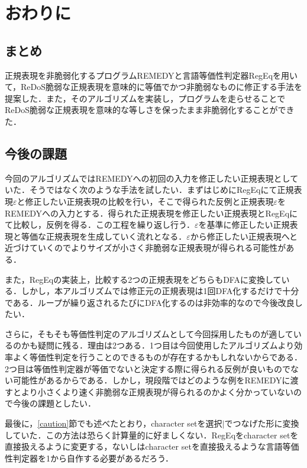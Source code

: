 \documentclass[a4paper, 12pt, dvipdfmx, uplatex]{jsreport}
\begin{document}
\chapter{おわりに}
\section{まとめ}
正規表現を非脆弱化するプログラムREMEDYと言語等価性判定器RegEqを用いて，ReDoS脆弱な正規表現を意味的に等価でかつ非脆弱なものに修正する手法を提案した．また，そのアルゴリズムを実装し，プログラムを走らせることでReDoS脆弱な正規表現を意味的な等しさを保ったまま非脆弱化することができた．

\section{今後の課題}
今回のアルゴリズムではREMEDYへの初回の入力を修正したい正規表現としていた．そうではなく次のような手法を試したい．まずはじめにRegEqにて正規表現$\varepsilon$と修正したい正規表現の比較を行い，そこで得られた反例と正規表現$\varepsilon$をREMEDYへの入力とする．得られた正規表現を修正したい正規表現とRegEqにて比較し，反例を得る．この工程を繰り返し行う．$\varepsilon$を基準に修正したい正規表現と等価な正規表現を生成していく流れとなる．$\varepsilon$から修正したい正規表現へと近づけていくのでよりサイズが小さく非脆弱な正規表現が得られる可能性がある．

また，RegEqの実装上，比較する2つの正規表現をどちらもDFAに変換している．しかし，本アルゴリズムでは修正元の正規表現は1回DFA化するだけで十分である．ループが繰り返されるたびにDFA化するのは非効率的なので今後改良したい．

さらに，そもそも等価性判定のアルゴリズムとして今回採用したものが適しているのかも疑問に残る．理由は2つある．1つ目は今回使用したアルゴリズムより効率よく等価性判定を行うことのできるものが存在するかもしれないからである．2つ目は等価性判定器が等価でないと決定する際に得られる反例が良いものでない可能性があるからである．しかし，現段階ではどのような例をREMEDYに渡すとより小さくより速く非脆弱な正規表現が得られるのかよく分かっていないので今後の課題としたい．

最後に，\ref{caution}節でも述べたとおり，character setを選択$|$でつなげた形に変換していた．この方法は恐らく計算量的に好ましくない．RegEqをcharacter setを直接扱えるように変更する，ないしはcharacter setを直接扱えるような言語等価性判定器を1から自作する必要があるだろう．

% 
% 
\end{document}
